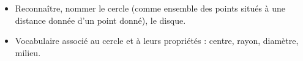 \begin{prerequis}    
   \begin{itemize}        
       \item[\emoji{red-heart}] Reconnaître, nommer le cercle (comme ensemble des points situés à une distance donnée d’un point donné), le disque.
       \columnbreak
       \item[\emoji{diamond-suit}] Vocabulaire associé au cercle et à leurs propriétés : centre, rayon, diamètre, milieu.
   \end{itemize}
\end{prerequis}